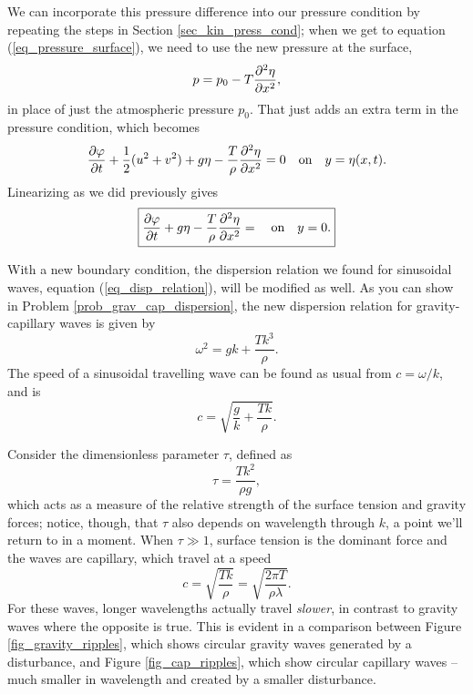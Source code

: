 We can incorporate this pressure difference into our pressure condition by repeating the steps in Section \ref{sec_kin_press_cond}; when we get to equation (\ref{eq_pressure_surface}), we need to use the new pressure at the surface, 
\[
p = p_0 - T \frac{\partial^2 {\eta}}{\partial {x}^2},
\]
in place of just the atmospheric pressure $p_0$.  That just adds an extra term in the pressure condition, which becomes
\begin{equation}
\label{eq_pressure_cond_cap}
\frac{\partial {\varphi}}{\partial {t}} +  \frac{1}{2}(u^2 + v^2) + g\eta  - \frac{T}{\rho} \frac{\partial^2 {\eta}}{\partial {x}^2} = 0 \quad \text{on} \quad y = \eta(x, t).
\end{equation}
Linearizing as we did previously gives
\begin{equation}
\label{eq_pressure_cond_cap_lin}
\boxed{
\frac{\partial {\varphi}}{\partial {t}} + g\eta - \frac{T}{\rho} \frac{\partial^2 {\eta}}{\partial {x}^2} = \quad \text{on} \quad y=0.
}
\end{equation}

With a new boundary condition, the dispersion relation we found for sinusoidal waves, equation (\ref{eq_disp_relation}), will be modified as well.  As you can show in Problem \ref{prob_grav_cap_dispersion}, the new dispersion relation for gravity-capillary waves is given by
\begin{equation}
\boxed{
\omega^2 = gk + \frac{Tk^3}{\rho}.
}
\end{equation}
The speed of a sinusoidal travelling wave can be found as usual from $c = \omega/k$, and is
\begin{equation}
c = \sqrt{ \frac{g}{k} + \frac{Tk}{\rho} }.
\end{equation}

Consider the dimensionless parameter $\tau$, defined as
\begin{equation}
\tau = \frac{Tk^2}{\rho g},
\end{equation}
which acts as a measure of the relative strength of the surface tension and gravity forces; notice, though, that $\tau$ also depends on wavelength through $k$, a point we'll return to in a moment.  When $\tau \gg 1$, surface tension is the dominant force and the waves are capillary, which travel at a speed
\begin{equation}
c = \sqrt{\frac{Tk}{\rho}} = \sqrt{ \frac{2\pi T}{\rho \lambda}}.
\end{equation}
For these waves, longer wavelengths actually travel \emph{slower}, in contrast to gravity waves where the opposite is true.  This is evident in a comparison between Figure \ref{fig_gravity_ripples}, which shows circular gravity waves generated by a disturbance, and Figure \ref{fig_cap_ripples}, which show circular capillary waves -- much smaller in wavelength and created by a smaller disturbance.  


